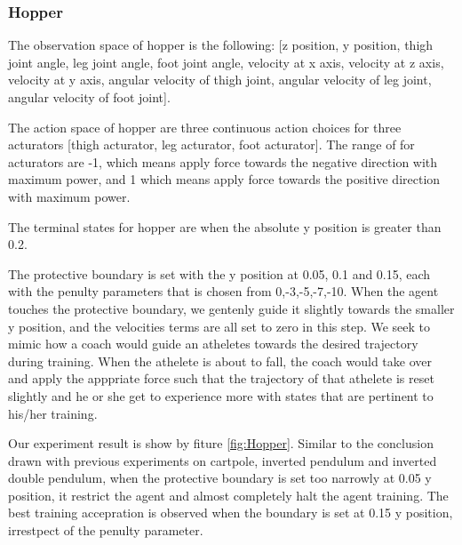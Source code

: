 \documentclass[journal]{IEEEtran}
\begin{document}
\subsubsection{Hopper}
The observation space of hopper is the following: [z position, y position, thigh joint angle, leg joint angle, foot joint angle, velocity at x axis, velocity at z axis, velocity at y axis, angular velocity of thigh joint, angular velocity of leg joint, angular velocity of foot joint].

The action space of hopper are three continuous action choices for three acturators [thigh acturator, leg acturator, foot acturator]. The range of for acturators are -1, which means apply force towards the negative direction with maximum power, and 1 which means apply force towards the positive direction with maximum power.

The terminal states for hopper are when the absolute y position is greater than 0.2.

The protective boundary is set with the y position at 0.05, 0.1 and 0.15, each with the penulty parameters that is chosen from 0,-3,-5,-7,-10. When the agent touches the protective boundary, we gentenly guide it slightly towards the smaller y position, and the velocities terms are all set to zero in this step. We seek to mimic how a coach would guide an atheletes towards the desired trajectory during training. When the athelete is about to fall, the coach would take over and apply the apppriate force such that the trajectory of that athelete is reset slightly and he or she get to experience more with states that are pertinent to his/her training.

Our experiment result is show by fiture \ref{fig:Hopper}. Similar to the conclusion drawn with previous experiments on cartpole, inverted pendulum and inverted double pendulum, when the protective boundary is set too narrowly at 0.05 y position, it restrict the agent and almost completely halt the agent training. The best training accepration is observed when the boundary is set at 0.15 y position, irrestpect of the penulty parameter.
\end{document}
